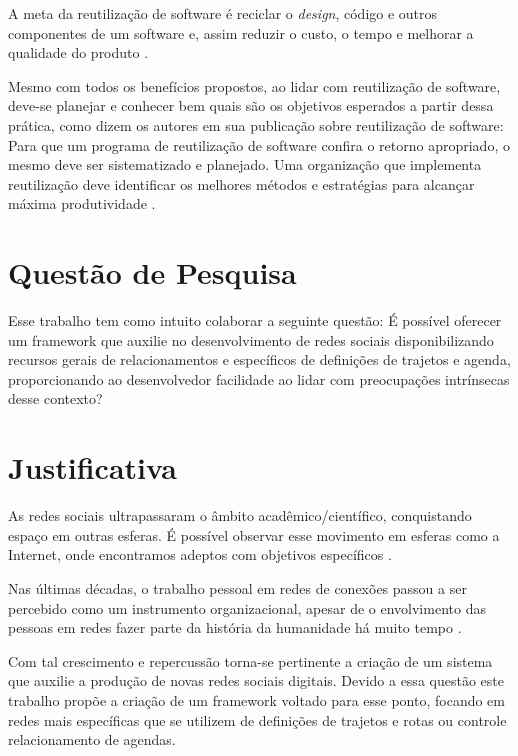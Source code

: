 A meta da reutilização de software é reciclar o \textit{design}, código e outros componentes de um software e, assim reduzir o custo, o tempo e melhorar a qualidade do produto \cite{Keswani:Joshi:Jatain:2014}.

Mesmo com todos os benefícios propostos, ao lidar com reutilização de software, deve-se planejar e conhecer bem quais são os objetivos esperados a partir dessa prática, como dizem os autores em sua publicação sobre reutilização de software: Para que um programa de reutilização de software confira o retorno apropriado, o mesmo deve ser sistematizado e planejado. Uma organização que implementa reutilização deve identificar os melhores métodos e estratégias para alcançar máxima produtividade \cite{Keswani:Joshi:Jatain:2014}.

\section{Questão de Pesquisa}

Esse trabalho tem como intuito colaborar a seguinte questão: É possível oferecer um framework que auxilie no desenvolvimento de redes sociais disponibilizando recursos gerais de relacionamentos e específicos de definições de trajetos e agenda, proporcionando ao desenvolvedor facilidade ao lidar com preocupações intrínsecas desse contexto?

\section{Justificativa}

As redes sociais ultrapassaram o âmbito acadêmico/científico, conquistando espaço em outras esferas. É possível observar esse movimento em esferas como a Internet, onde encontramos adeptos com objetivos específicos \cite{Tomae:Alcara:Chiara:2005}.

Nas últimas décadas, o trabalho pessoal em redes de conexões passou a ser percebido como um instrumento organizacional, apesar de o envolvimento das pessoas em redes fazer parte da história da humanidade há muito tempo \cite{Tomae:Alcara:Chiara:2005}.

Com tal crescimento e repercussão torna-se pertinente a criação de um sistema que auxilie a produção de novas redes sociais digitais. Devido a essa questão este trabalho propõe a criação de um framework voltado para esse ponto, focando em redes mais específicas que se utilizem de definições de trajetos e rotas ou controle relacionamento de agendas.


